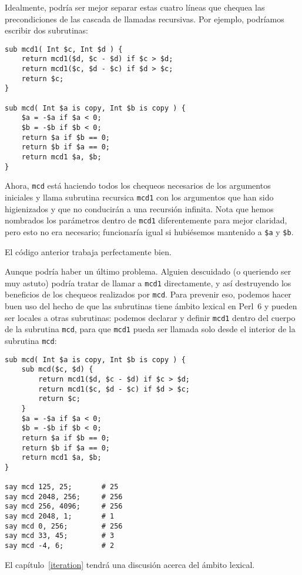 Idealmente, podría ser mejor separar estas cuatro líneas que
chequea las precondiciones de las cascada de llamadas recursivas.
Por ejemplo, podríamos escribir dos subrutinas:

\begin{verbatim}
sub mcd1( Int $c, Int $d ) {
    return mcd1($d, $c - $d) if $c > $d;
    return mcd1($c, $d - $c) if $d > $c;
    return $c;
}

sub mcd( Int $a is copy, Int $b is copy ) { 
    $a = -$a if $a < 0;
    $b = -$b if $b < 0;
    return $a if $b == 0;
    return $b if $a == 0;
    return mcd1 $a, $b;
}
\end{verbatim}
%

Ahora, {\tt mcd} está haciendo todos los chequeos necesarios
de los argumentos iniciales y llama subrutina recursica {\tt mcd1}
con los argumentos que han sido higienizados y que no conducirán
a una recursión infinita. Nota que hemos nombrados los parámetros
dentro de {\tt mcd1} diferentemente para mejor claridad, pero esto
no era necesario; funcionaría igual si hubiésemos mantenido  
a {\tt \$a} y {\tt \$b}.

El código anterior trabaja perfectamente bien.

Aunque podría haber un último problema. Alguien descuidado
(o queriendo ser muy astuto) podría tratar de llamar a {\tt mcd1}
directamente, y así destruyendo los beneficios de los chequeos
realizados por {\tt mcd}. Para prevenir eso, podemos hacer buen uso
del hecho de que las subrutinas tiene ámbito lexical en Perl~6
y pueden ser locales a otras subrutinas: podemos declarar y definir
{\tt mcd1} dentro del cuerpo de la subrutina {\tt mcd}, para que {\tt mcd1}
pueda ser llamada solo desde el interior de la subrutina {\tt mcd}:

\begin{verbatim}
sub mcd( Int $a is copy, Int $b is copy ) { 
    sub mcd($c, $d) {
        return mcd1($d, $c - $d) if $c > $d;
        return mcd1($c, $d - $c) if $d > $c;
        return $c;
    }
    $a = -$a if $a < 0;
    $b = -$b if $b < 0;
    return $a if $b == 0;
    return $b if $a == 0;
    return mcd1 $a, $b;
}

say mcd 125, 25;       # 25
say mcd 2048, 256;     # 256
say mcd 256, 4096;     # 256
say mcd 2048, 1;       # 1
say mcd 0, 256;        # 256
say mcd 33, 45;        # 3
say mcd -4, 6;         # 2
\end{verbatim}

El capítulo~\ref{iteration} tendrá una discusión acerca del ámbito lexical.

